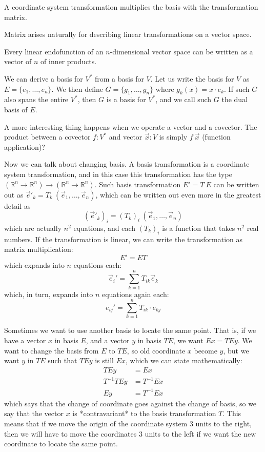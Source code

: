 A coordinate system transformation multiplies the basis with the transformation matrix.

Matrix arises naturally for describing linear transformations on a vector space.

Every linear endofunction of an $n$-dimensional vector space can be written as a vector of $n$ of inner products.

We can derive a basis for $V^*$ from a basis for $V$.
Let us write the basis for $V$ as \(E = \{ e_1, \ldots, e_n\}\).
We then define $G = \{ g_1, \ldots, g_n \}$ where \(g_k(x) = x \cdot e_k\).
If such $G$ also spans the entire $V^*$,
then $G$ is a basis for $V^*$,
and we call such $G$ the dual basis of $E$.

A more interesting thing happens when we operate a vector and a covector.
The product between a covector $f : V^*$ and vector $\vec{x} : V$
is simply $f~\vec{x}$ (function application)?

Now we can talk about changing basis.
A basis transformation is a coordinate system transformation,
and in this case this transformation has the type
$(\mathbb{R}^n \to \mathbb{R}^n) \to (\mathbb{R}^n \to \mathbb{R}^n)$.
Such basis transformation $E' = T~E$ can be written out
as $\vec{e}'_k = T_k~(\vec{e}_1, \ldots, \vec{e}_n)$,
which can be written out even more in the greatest detail as
\[
(\vec{e}'_k)_i = (T_k)_i~(\vec{e}_1, \ldots, \vec{e}_n)
\]
which are actually $n^2$ equations,
and each $(T_k)_i$ is a function that takes $n^2$ real numbers.
If the transformation is linear,
we can write the transformation as matrix multiplication:
\[
E' = ET
\]
which expands into $n$ equations each:
\[
\vec{e}_i' = \sum_{k=1}^n T_{ik} \vec{e}_k
\]
which, in turn, expands into $n$ equations again each:
\[
e_{ij}' = \sum_{k=1}^n T_{ik} \cdot e_{kj}
\]

Sometimes we want to use another basis to locate the same point.
That is, if we have a vector $x$ in basis $E$, and a vector $y$ in basis $TE$,
we want $Ex = TEy$.
We want to change the basis from $E$ to $TE$,
so old coordinate $x$ become $y$,
but we want $y$ in $TE$ such that $TEy$ is still $Ex$,
which we can state mathematically:
\begin{align*}
TEy &= Ex
\\ T^{-1}TEy &= T^{-1}Ex
\\ Ey &= T^{-1}Ex
\end{align*}
which says that the change of coordinate goes against the change of basis,
so we say that the vector $x$ is *contravariant* to the basis transformation $T$.
This means that if we move the origin of the coordinate system 3 units to the right,
then we will have to move the coordinates 3 units to the left
if we want the new coordinate to locate the same point.

